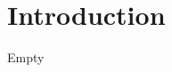 \documentclass[a4paper,11pt]{article}
\begin{document}


\section{Introduction}
Empty
\end{document}
